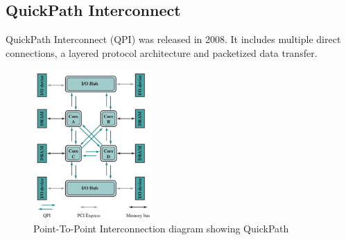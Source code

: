 \subsection*{QuickPath Interconnect}
QuickPath Interconnect (QPI) was released in 2008. It includes multiple direct connections, a layered protocol architecture and packetized data transfer.

\begin{figure}[H]
    \centering
    \includegraphics[width=0.4\textwidth]{assets/qpi.png} 
    \caption*{Point-To-Point Interconnection diagram showing QuickPath}
\end{figure}